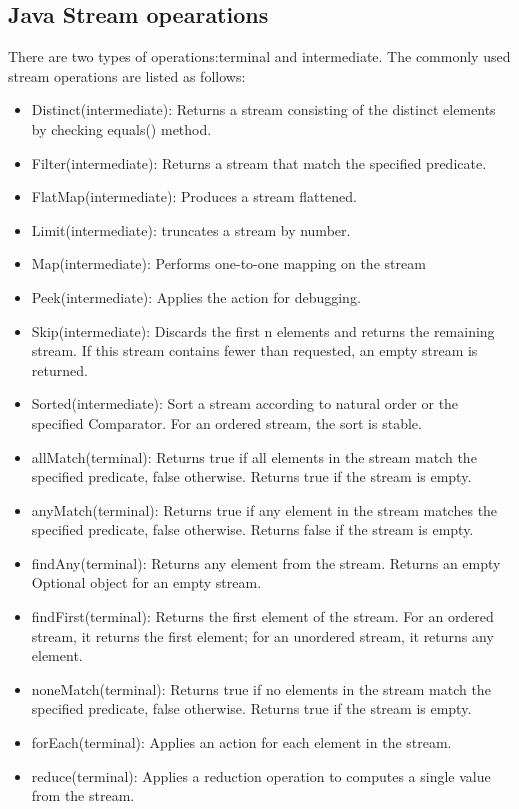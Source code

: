 \documentclass[twoside]{article}
\begin{document}
\subsection{Java Stream opearations}
There are two types of operations:terminal and intermediate. The commonly used stream operations are listed as follows:
\begin{itemize}
\item Distinct(intermediate):
Returns a stream consisting of the distinct elements by checking equals() method.
\item Filter(intermediate):
Returns a stream that match the specified predicate.
\item FlatMap(intermediate):
Produces a stream flattened.
\item Limit(intermediate):
truncates a stream by number.
\item Map(intermediate):
Performs one-to-one mapping on the stream
\item Peek(intermediate):
Applies the action for debugging.
\item Skip(intermediate):
Discards the first n elements and returns the remaining stream. If this stream contains fewer than requested, an empty stream is returned.
\item Sorted(intermediate):
Sort a stream according to natural order or the specified Comparator. For an ordered stream, the sort is stable.
\item allMatch(terminal):
Returns true if all elements in the stream match the specified predicate, false otherwise. Returns true if the stream is empty.
\item anyMatch(terminal):
Returns true if any element in the stream matches the specified predicate, false otherwise. Returns false if the stream is empty.
\item findAny(terminal):
Returns any element from the stream. Returns an empty Optional object for an empty stream.
\item findFirst(terminal):
Returns the first element of the stream. For an ordered stream, it returns the first element; for an unordered stream, it returns any element.
\item noneMatch(terminal):
Returns true if no elements in the stream match the specified predicate, false otherwise. Returns true if the stream is empty.
\item forEach(terminal):
Applies an action for each element in the stream.
\item reduce(terminal):
Applies a reduction operation to computes a single value from the stream.
\end{itemize} 
\end{document}
